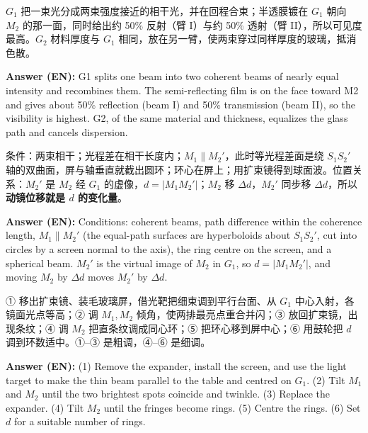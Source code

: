 \documentclass[11pt]{ctexart}
\begin{document}

\(G_1\) 把一束光分成两束强度接近的相干光，并在回程合束；半透膜镀在 \(G_1\) 朝向 \(M_2\) 的那一面，同时给出约 50\% 反射（臂 I）与约 50\% 透射（臂 II），所以可见度最高。\(G_2\) 材料厚度与 \(G_1\) 相同，放在另一臂，使两束穿过同样厚度的玻璃，抵消色散。

\textbf{Answer (EN):} G1 splits one beam into two coherent beams of nearly equal intensity and recombines them. The semi-reflecting film is on the face toward M2 and gives about 50\% reflection (beam I) and 50\% transmission (beam II), so the visibility is highest. G2, of the same material and thickness, equalizes the glass path and cancels dispersion.


条件：两束相干；光程差在相干长度内；\(M_1\parallel M_2'\)，此时等光程差面是绕 \(S_1S_2'\) 轴的双曲面，屏与轴垂直就截出圆环；环心在屏上；用扩束镜得到球面波。位置关系：\(M_2'\) 是 \(M_2\) 经 \(G_1\) 的虚像，\(d=|M_1M_2'|\)；\(M_2\) 移 \(\Delta d\)，\(M_2'\) 同步移 \(\Delta d\)，所以\textbf{动镜位移就是 \(d\) 的变化量}。

\textbf{Answer (EN):} Conditions: coherent beams, path difference within the coherence length, $M_1\parallel M_2'$ (the equal-path surfaces are hyperboloids about $S_1S_2'$, cut into circles by a screen normal to the axis), the ring centre on the screen, and a spherical beam. $M_2'$ is the virtual image of $M_2$ in $G_1$, so $d=|M_1M_2'|$, and moving $M_2$ by $\Delta d$ moves $M_2'$ by $\Delta d$.


① 移出扩束镜、装毛玻璃屏，借光靶把细束调到平行台面、从 \(G_1\) 中心入射，各镜面光点等高；② 调 \(M_1,M_2\) 倾角，使两排最亮点重合并闪；③ 放回扩束镜，出现条纹；④ 调 \(M_2\) 把直条纹调成同心环；⑤ 把环心移到屏中心；⑥ 用鼓轮把 \(d\) 调到环数适中。①--③ 是粗调，④--⑥ 是细调。

\textbf{Answer (EN):} (1) Remove the expander, install the screen, and use the light target to make the thin beam parallel to the table and centred on $G_1$. (2) Tilt $M_1$ and $M_2$ until the two brightest spots coincide and twinkle. (3) Replace the expander. (4) Tilt $M_2$ until the fringes become rings. (5) Centre the rings. (6) Set $d$ for a suitable number of rings.

\end{document}
